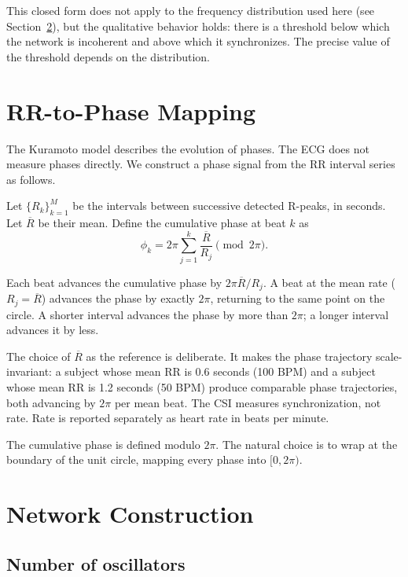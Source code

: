 \documentclass[11pt]{article}
\begin{document}
This closed form does not apply to the frequency distribution used here
(see Section~\ref{sec:network}), but the qualitative behavior holds:
there is a threshold below which the network is incoherent and above
which it synchronizes. The precise value of the threshold depends on
the distribution.

\section{RR-to-Phase Mapping}\label{sec:rrphase}

The Kuramoto model describes the evolution of phases. The ECG does not
measure phases directly. We construct a phase signal from the RR
interval series as follows.

Let $\{R_k\}_{k=1}^{M}$ be the intervals between successive detected
R-peaks, in seconds. Let $\overline{R}$ be their mean. Define the
cumulative phase at beat $k$ as
\begin{equation}
\phi_k = 2\pi \sum_{j=1}^{k} \frac{\overline{R}}{R_j} \pmod{2\pi}.
\label{eq:rrphase}
\end{equation}

Each beat advances the cumulative phase by $2\pi \overline{R}/R_j$. A
beat at the mean rate ($R_j = \overline{R}$) advances the phase by
exactly $2\pi$, returning to the same point on the circle. A shorter
interval advances the phase by more than $2\pi$; a longer interval
advances it by less.

The choice of $\overline{R}$ as the reference is deliberate. It makes
the phase trajectory scale-invariant: a subject whose mean RR is 0.6
seconds (100 BPM) and a subject whose mean RR is 1.2 seconds (50 BPM)
produce comparable phase trajectories, both advancing by $2\pi$ per
mean beat. The CSI measures synchronization, not rate. Rate is reported
separately as heart rate in beats per minute.

The cumulative phase is defined modulo $2\pi$. The natural choice is to
wrap at the boundary of the unit circle, mapping every phase into
$[0, 2\pi)$.

\section{Network Construction}\label{sec:network}

\subsection{Number of oscillators}
\end{document}
